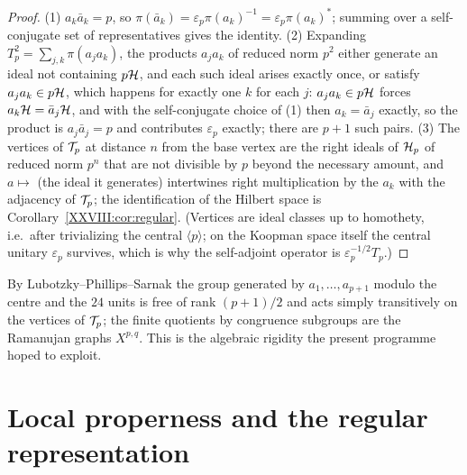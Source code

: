 \begin{proof}
(1) $a_k\bar a_k=p$, so $\pi(\bar a_k)=\varepsilon_p\pi(a_k)^{-1}=\varepsilon_p\pi(a_k)^*$;
summing over a self-conjugate set of representatives gives the identity. (2) Expanding
$T_p^2=\sum_{j,k}\pi(a_ja_k)$, the products $a_ja_k$ of reduced norm $p^2$ either generate an ideal
not containing $p\mathcal{H}$, and each such ideal arises exactly once, or satisfy $a_ja_k\in p\mathcal{H}$, which
happens for exactly one $k$ for each $j$: $a_ja_k\in p\mathcal{H}$ forces $a_k\mathcal{H}=\bar a_j\mathcal{H}$, and
with the self-conjugate choice of (1) then $a_k=\bar a_j$ exactly, so the product is
$a_j\bar a_j=p$ and contributes $\varepsilon_p$ exactly; there are $p+1$ such pairs. (3) The vertices of $\mathcal{T}_p$ at distance $n$ from the base vertex are
the right ideals of $\mathcal{H}_p$ of reduced norm $p^n$ that are not divisible by $p$ beyond the
necessary amount, and $a\mapsto$ (the ideal it generates) intertwines right multiplication by the
$a_k$ with the adjacency of $\mathcal{T}_p$; the identification of the Hilbert space is
Corollary~\ref{XXVIII:cor:regular}. (Vertices are ideal classes up to homothety, i.e.\ after
trivializing the central $\langle p\rangle$; on the Koopman space itself the central unitary
$\varepsilon_p$ survives, which is why the self-adjoint operator is
$\varepsilon_p^{-1/2}T_p$.)
\end{proof}

\begin{remark}
By Lubotzky--Phillips--Sarnak the group generated by $a_1,\dots,a_{p+1}$ modulo the centre and the
$24$ units is free of rank $(p+1)/2$ and acts simply transitively on the vertices of $\mathcal{T}_p$; the
finite quotients by congruence subgroups are the Ramanujan graphs $X^{p,q}$. This is the algebraic
rigidity the present programme hoped to exploit.
\end{remark}

\section{Local properness and the regular representation}\label{XXVIII:sec:proper}

